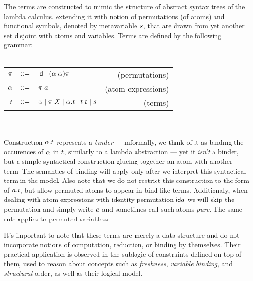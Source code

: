 \documentclass[english, mgr]{iithesis}
\renewcommand{\it}[1]{\textit{#1}}
\begin{document}
The terms are constructed to mimic the structure of abstract syntax trees of the lambda calculus,
extending it with notion of permutations (of atoms) and functional symbols,
denoted by metavariable $s$,
that are drawn from yet another set disjoint with atoms and variables.
Terms are defined by the following grammar:
\\ \\
\begin{tabular}{rclr}
    $\pi$    & $::=$ & $\mathsf{id} \mid (\alpha\ \alpha) \pi$  & (permutations) \\
    $\alpha$ & $::=$ & $\pi \; a$  & (atom expressions) \\
    $t$    & $::=$ & $\alpha \mid \pi \; X \mid \alpha. t \mid t \; t \mid s$  & (terms)
\end{tabular}
\\ \\
Construction $\alpha. t$ represents a \it{binder} ---
informally, we think of it as binding the occurences of $\alpha$ in $t$,
similarly to a lambda abstraction --- yet it \it{isn't} a binder,
but a simple syntactical construction glueing together an atom with another term.
The semantics of binding will apply only after we interpret this syntactical term in the model.
Also note that we do not restrict this construction to the form of $a. t$,
but allow permuted atoms to appear in bind-like terms.
Additionaly, when dealing with atom expressions with identity permutation $\mathsf{id} a$
we will skip the permutation and simply write $a$ and sometimes call such
atoms \it{pure}. The same rule applies to permuted variabless

It's important to note that these terms are merely a data structure
and do not incorporate notions of computation, reduction, or binding by themselves.
Their practical application is observed in the sublogic of constraints defined on top of them,
used to reason about concepts such as \it{freshness}, \it{variable binding}, and \it{structural} order, as well as their logical model.
\end{document}
